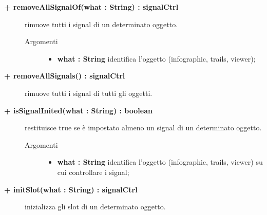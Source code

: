 \begin{description}
	\begin{description}
		\item[\textbf{\color{blue}+ removeAllSignalOf(what : String) : signalCtrl			}] \hfill
			rimuove tutti i signal di un determinato oggetto.
			
		\begin{description}
			\item[Argomenti] \hfill
				\begin{itemize}
				
					\item \textbf{what : String			} \hfill
					identifica l'oggetto (infographic, trails, viewer);
					
				\end{itemize}
		\end{description}
	\end{description}
	
	\begin{description}
		\item[\textbf{\color{blue}+ removeAllSignals() : signalCtrl		}] \hfill
			rimuove tutti i signal di tutti gli oggetti.
			
	\end{description}
	
	\begin{description}
		\item[\textbf{\color{blue}+ isSignalInited(what : String) : boolean			}] \hfill
			restituisce true se è impostato almeno un signal di un determinato oggetto.
			
		\begin{description}
			\item[Argomenti] \hfill
				\begin{itemize}
				
					\item \textbf{what : String			} \hfill
					identifica l'oggetto (infographic, trails, viewer) su cui controllare i signal;
					
				\end{itemize}
		\end{description}
	\end{description}
	
	\begin{description}
		\item[\textbf{\color{blue}+ initSlot(what : String) : signalCtrl			}] \hfill
			inizializza gli slot di un determinato oggetto.
			

\end{description}
\end{description}
